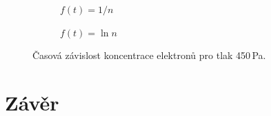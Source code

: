 \documentclass[a4paper,12pt]{article}
\begin{document}
\begin{figure}[h]
	\centering
	\begin{subfigure}[b]{.49\linewidth}
		\centering
		\caption{$f(t) = 1/n$}
	\end{subfigure}
	\begin{subfigure}[b]{.49\linewidth}
		\centering
		\caption{$f(t) = \ln n$}
	\end{subfigure}
	\caption{Časová závislost koncentrace elektronů pro tlak 450\,Pa.}
	\label{g:450Pa}
\end{figure}

\clearpage
\section{Závěr}
\end{document}
